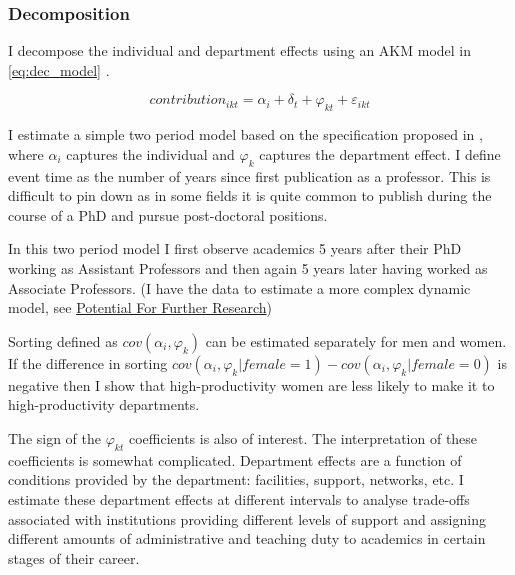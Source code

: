 \documentclass[10pt]{report}
\begin{document}
\subsubsection*{Decomposition}

I decompose the individual and department effects using an AKM model in \autoref{eq:dec_model} \parencite[]{Abowd1999}.

\begin{equation}
    \label{eq:dec_model}
    contribution_{ikt} = \alpha_i + \delta_t + \varphi_{kt} + \varepsilon_{ikt}
\end{equation}

I estimate a simple two period model based on the specification proposed in \textcite{Bonhomme2019}, where \(\alpha_i\) captures the individual and \(\varphi_k\) captures the department effect. I define event time as the number of years since first publication as a professor. This is difficult to pin down as in some fields it is quite common to publish during the course of a PhD and pursue post-doctoral positions.



In this two period model I first observe academics 5 years after their PhD working as Assistant Professors and then again 5 years later having worked as Associate Professors. (I have the data to estimate a more complex dynamic model, see \hyperref[sec:potential]{Potential For Further Research})

Sorting defined as \(cov(\alpha_i, \varphi_k)\) can be estimated separately for men and women. If the difference in sorting \(cov(\alpha_i, \varphi_k | female = 1) - cov(\alpha_i, \varphi_k | female = 0)\) is negative then I show that high-productivity women are less likely to make it to high-productivity departments.

The sign of the \(\varphi_{kt}\) coefficients is also of interest. The interpretation of these coefficients is somewhat complicated. Department effects are a function of conditions provided by the department: facilities, support, networks, etc. I estimate these department effects at different intervals to analyse trade-offs associated with institutions providing different levels of support and assigning different amounts of administrative and teaching duty to academics in certain stages of their career.
\end{document}
